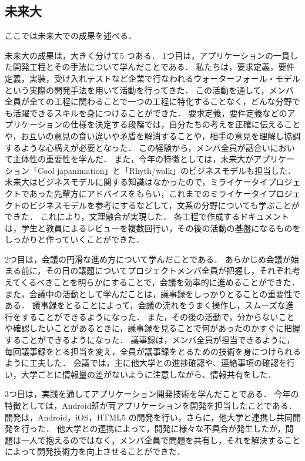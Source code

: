 \subsection{未来大}
\par
ここでは未来大での成果を述べる．
\par
未来大の成果は，大きく分けて5 つある．
1つ目は，アプリケーションの一貫した開発工程とその手法について学んだことである．
私たちは，要求定義，要件定義，実装，受け入れテストなど企業で行なわれるウォーターフォール・モデルという実際の開発手法を用いて活動を行ってきた．
この活動を通して，メンバ全員が全ての工程に関わることで一つの工程に特化することなく，どんな分野でも活躍できるスキルを身につけることができた．
要求定義，要件定義などのアプリケーションの仕様を決定する段階では，自分たちの考えを正確に伝えることや，お互いの意見の食い違いや矛盾を解消することや，相手の意見を理解し協調するような心構えが必要となった．
この経験から，メンバ全員が話合いにおいて主体性の重要性を学んだ．
また，今年の特徴としては，未来大がアプリケーション「Cool japanimation」と「Rhyth/walk」のビジネスモデルも担当した．
未来大はビジネスモデルに関する知識はなかったので，ミライケータイプロジェクトであった先輩方にアドバイスをもらい，これまでのミライケータイプロジェクトのビジネスモデルを参考にするなどして，文系の分野についても学ぶことができた．
これにより，文理融合が実現した．
各工程で作成するドキュメントは，学生と教員によるレビューを複数回行い，その後の活動の基盤になるものをしっかりと作っていくことができた．
\par
2つ目は，会議の円滑な進め方について学んだことである．
あらかじめ会議が始まる前に，その日の議題についてプロジェクトメンバ全員が把握し，それぞれ考えてくるべきことを明らかにすることで，会議を効率的に進めることができた．
また，会議中の活動として学んだことは，議事録をしっかりとることの重要性である．
議事録をとることによって，会議の流れをうまく操作し，スムーズな進行をすることができるようになった．
また，その後の活動で，分からないことや確認したいことがあるときに，議事録を見ることで何があったのかすぐに把握することができるようになった．
議事録は，メンバ全員が担当できるように，毎回議事録をとる担当を変え，全員が議事録をとるための技術を身につけられるように工夫した．
会議では，主に他大学との進捗確認や、連絡事項の確認を行い，大学ごとに情報量の差がないように注意しながら、情報共有をした．
\par
3つ目は，実践を通してアプリケーション開発技術を学んだことである．
今年の特徴としては，Android班が両アプリケーションを開発を担当したことである．
開発は，Android，iOS，HTML5 の開発を行い，さらに，他大学と連携し共同開発を行った．
他大学との連携によって，開発に様々な不具合が発生したが，問題は一人で抱えるのではなく，メンバ全員で問題を共有し，それを解決することによって開発技術力を向上させることができた．
